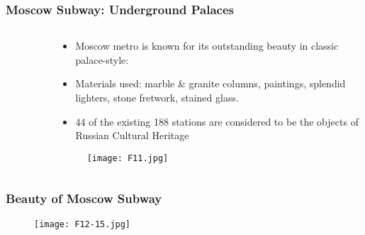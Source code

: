 \documentclass[pdflatex,compress,8pt,
	xcolor={dvipsnames,dvipsnames,svgnames,x11names,table},
	hyperref={colorlinks = true,breaklinks = true, urlcolor = NavyBlue, breaklinks = true}]{beamer}
\begin{document}
\begin{frame}\frametitle{Moscow Subway: Underground Palaces}
\begin{minipage}[0.4\textheight]{\textwidth}
\begin{columns}[T]
\begin{column}{0.5\textwidth}
\begin{figure}[H]
	\centering
			\hspace{5mm}
\end{figure}
\end{column}
\begin{column}{0.5\textwidth}
\vspace{1em}
\begin{itemize}
	\item Moscow metro is known for its outstanding beauty in classic palace-style: 
	\item Materials used: marble \& granite columns, paintings, splendid lighters, stone fretwork, stained glass.
	\item 44 of the existing 188 stations are considered to be the objects of Russian Cultural Heritage 
\end{itemize}
\begin{figure}[H]
	\centering
		\texttt{[image: F11.jpg]}
\end{figure}
\end{column}
\end{columns}
\end{minipage}
\end{frame}

\begin{frame}\frametitle{Beauty of Moscow Subway}
\begin{figure}[H]
	\centering
		\texttt{[image: F12-15.jpg]}
\end{figure}
\end{frame}
\end{document}
